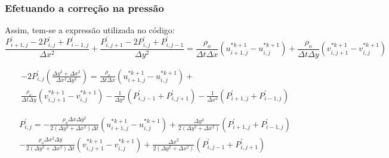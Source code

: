 \documentclass[xcolor=dvipsnames,10pt,aspectratio=169]{beamer}
\begin{document}
	\begin{frame}
		\frametitle{Efetuando a correção na pressão}
		Assim, tem-se a expressão utilizada no código:
		\begin{equation}
			\frac{ P^{\prime}_{i + 1, j} - 2 P^{\prime}_{i , j} + P^{\prime}_{i - 1 , j} }{\Delta x^2} + \frac{ P^{\prime}_{i, j + 1} - 2 P^{\prime}_{i , j} + P^{\prime}_{i , j- 1} }{\Delta y^2} = \frac{\rho_o}{ \Delta t \Delta x} \left(u_{i + 1 , j}^{\ast k + 1} - u_{i , j}^{\ast k + 1} \right) + \frac{\rho_o}{ \Delta t \Delta y } \left( v_{i , j + 1}^{\ast k + 1} - v_{i , j}^{\ast k + 1}\right)
		\end{equation}

		\begin{equation}
			\begin{split}
			-2 P^{\prime}_{i , j} \left(   \frac{\Delta y^2 + \Delta x^2}{\Delta x^2 \Delta y^2} \right)  = \frac{\rho_o}{ \Delta t \Delta x} \left(u_{i + 1 , j}^{\ast k + 1} - u_{i , j}^{\ast k + 1} \right) + \\ \frac{\rho_o}{ \Delta t \Delta y } \left( v_{i , j + 1}^{\ast k + 1} - v_{i , j}^{\ast k + 1}\right) - \frac{1}{\Delta y^2} \left(P^{\prime}_{i , j- 1} + P^{\prime}_{i, j + 1} \right) - \frac{1}{\Delta x^2} \left(P^{\prime}_{i + 1, j} +  P^{\prime}_{i - 1 , j}\right)
			\end{split}
		\end{equation}

		\begin{equation}
		\begin{split}
		P^{\prime}_{i , j}  = - \frac{\rho_o \Delta x \Delta y^2 }{ 2 ( \Delta y^2 + \Delta x^2) \Delta t} \left(u_{i + 1 , j}^{\ast k + 1} - u_{i , j}^{\ast k + 1} \right) + \frac{\Delta y^2}{ 2 (\Delta y^2 + \Delta x^2)} \left(P^{\prime}_{i + 1, j} +  P^{\prime}_{i - 1 , j}\right) \\ - \frac{\rho_o \Delta x^2 \Delta y }{ 2 ( \Delta y^2 + \Delta x^2) \Delta t} \left( v_{i , j + 1}^{\ast k + 1} - v_{i , j}^{\ast k + 1}\right) + \frac{\Delta x^2}{ 2 (\Delta y^2 + \Delta x^2)} \left(P^{\prime}_{i , j- 1} + P^{\prime}_{i, j + 1} \right)
		\end{split}
		\end{equation}

	\end{frame}
\end{document}
